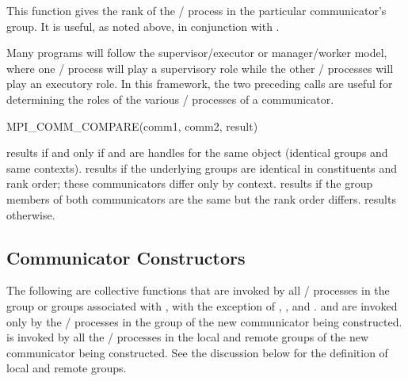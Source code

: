 \begin{users}
This function gives the rank of the \MPI/ process in the particular communicator's
group. It is useful, as noted above, in conjunction with
.

Many programs will follow the supervisor/executor or manager/worker model, where one \MPI/ process
will play a supervisory role while the other
\MPI/ processes will play an executory role. In this framework, the two preceding
calls are useful for determining the roles of the various \MPI/ processes of a
communicator.
\end{users}
%
%
\begin{funcdef}{MPI\_COMM\_COMPARE}{(\mbox{comm1}, \mbox{comm2}, \mbox{result})}
\end{funcdef}

\noindent{} results if and only if
 and  are handles for the same object
(identical groups and same contexts).
 results if the underlying groups are identical
in constituents and rank order; these communicators differ only by context.
 results if the group members of both
communicators are the same but the rank order
differs.  results otherwise.

\subsection{Communicator Constructors}
\label{subsec:context-intracomconst}
The following are collective functions that are invoked by all \MPI/ processes in the
group or groups associated with ,
with the exception of ,
, and\flushline
{}.
 and 
are invoked only by the \MPI/ processes in the group of the new communicator being constructed.\flushline
{} is invoked by
all the \MPI/ processes in the local and remote groups of the new communicator being constructed.
See the discussion below for the definition of local and remote groups.

